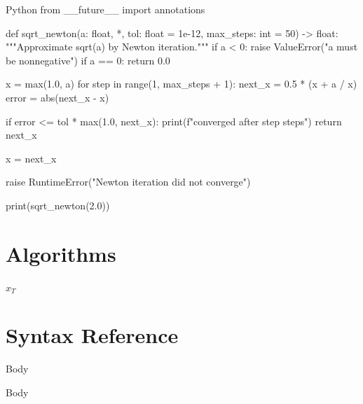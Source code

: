 \documentclass{report}
\begin{document}
\begin{codeblock}[title={Newton's method for square roots}]{Python}
from __future__ import annotations


def sqrt_newton(a: float, *, tol: float = 1e-12, max_steps: int = 50) -> float:
    """Approximate sqrt(a) by Newton iteration."""
    if a < 0:
        raise ValueError("a must be nonnegative")
    if a == 0:
        return 0.0

    x = max(1.0, a)
    for step in range(1, max_steps + 1):
        next_x = 0.5 * (x + a / x)
        error = abs(next_x - x)

        if error <= tol * max(1.0, next_x):
            print(f"converged after {step} steps")
            return next_x

        x = next_x

    raise RuntimeError("Newton iteration did not converge")


print(sqrt_newton(2.0))
\end{codeblock}

\section{Algorithms}
\begin{algorithm}[H]
\caption{Projected gradient descent}
\Return $x_T$\;
\end{algorithm}

\newpage
\section{Syntax Reference}

\begin{latexcodeblock}[title={Short Commands}]


\sol Body
\begin{sol}
Body
\end{sol}
\end{latexcodeblock}
\end{document}
